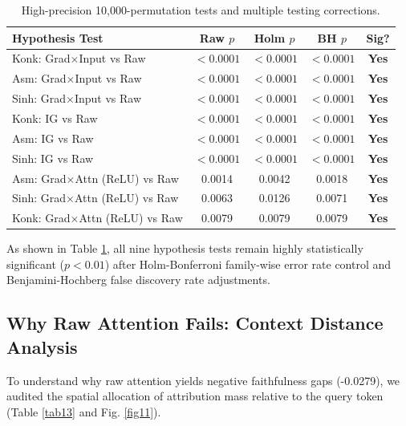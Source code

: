 \documentclass[default,iicol]{sn-jnl}
\begin{document}
\begin{table}[h]
\caption{High-precision 10,000-permutation tests and multiple testing corrections.}\label{tab11}
\centering
\begin{tabular}{lcccc}
\toprule
Hypothesis Test & Raw $p$ & Holm $p$ & BH $p$ & Sig? \\
\midrule
Konk: Grad$\times$Input vs Raw & $<0.0001$ & $<0.0001$ & $<0.0001$ & \textbf{Yes} \\
Asm: Grad$\times$Input vs Raw & $<0.0001$ & $<0.0001$ & $<0.0001$ & \textbf{Yes} \\
Sinh: Grad$\times$Input vs Raw & $<0.0001$ & $<0.0001$ & $<0.0001$ & \textbf{Yes} \\
Konk: IG vs Raw & $<0.0001$ & $<0.0001$ & $<0.0001$ & \textbf{Yes} \\
Asm: IG vs Raw & $<0.0001$ & $<0.0001$ & $<0.0001$ & \textbf{Yes} \\
Sinh: IG vs Raw & $<0.0001$ & $<0.0001$ & $<0.0001$ & \textbf{Yes} \\
Asm: Grad$\times$Attn (ReLU) vs Raw & 0.0014 & 0.0042 & 0.0018 & \textbf{Yes} \\
Sinh: Grad$\times$Attn (ReLU) vs Raw & 0.0063 & 0.0126 & 0.0071 & \textbf{Yes} \\
Konk: Grad$\times$Attn (ReLU) vs Raw & 0.0079 & 0.0079 & 0.0079 & \textbf{Yes} \\
\bottomrule
\end{tabular}
\end{table}

As shown in Table \ref{tab11}, all nine hypothesis tests remain highly statistically significant ($p < 0.01$) after Holm-Bonferroni family-wise error rate control and Benjamini-Hochberg false discovery rate adjustments.

\subsection{Why Raw Attention Fails: Context Distance Analysis}
To understand why raw attention yields negative faithfulness gaps (-0.0279), we audited the spatial allocation of attribution mass relative to the query token (Table \ref{tab13} and Fig. \ref{fig11}).
\end{document}
